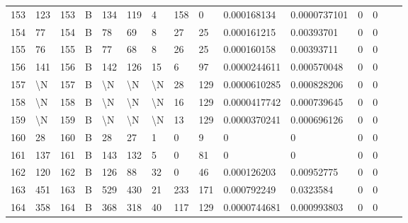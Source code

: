 \begin{longtable}{lllllllllllllll}
	153 & 123               & 153 & B   & 134               & 119               & 4                 & 158  & 0          & 0.000168134    & 0.0000737101   & 0             & 0            \\
	154 & 77                & 154 & B   & 78                & 69                & 8                 & 27   & 25         & 0.000161215    & 0.00393701     & 0             & 0            \\
	155 & 76                & 155 & B   & 77                & 68                & 8                 & 26   & 25         & 0.000160158    & 0.00393711     & 0             & 0            \\
	156 & 141               & 156 & B   & 142               & 126               & 15                & 6    & 97         & 0.0000244611   & 0.000570048    & 0             & 0            \\
	157 & \textbackslash{}N & 157 & B   & \textbackslash{}N & \textbackslash{}N & \textbackslash{}N & 28   & 129        & 0.0000610285   & 0.000828206    & 0             & 0            \\
	158 & \textbackslash{}N & 158 & B   & \textbackslash{}N & \textbackslash{}N & \textbackslash{}N & 16   & 129        & 0.0000417742   & 0.000739645    & 0             & 0            \\
	159 & \textbackslash{}N & 159 & B   & \textbackslash{}N & \textbackslash{}N & \textbackslash{}N & 13   & 129        & 0.0000370241   & 0.000696126    & 0             & 0            \\
	160 & 28                & 160 & B   & 28                & 27                & 1                 & 0    & 9          & 0              & 0              & 0             & 0            \\
	161 & 137               & 161 & B   & 143               & 132               & 5                 & 0    & 81         & 0              & 0              & 0             & 0            \\
	162 & 120               & 162 & B   & 126               & 88                & 32                & 0    & 46         & 0.000126203    & 0.00952775     & 0             & 0            \\
	163 & 451               & 163 & B   & 529               & 430               & 21                & 233  & 171        & 0.000792249    & 0.0323584      & 0             & 0            \\
	164 & 358               & 164 & B   & 368               & 318               & 40                & 117  & 129        & 0.0000744681   & 0.000993803    & 0             & 0            \\

\end{longtable}
